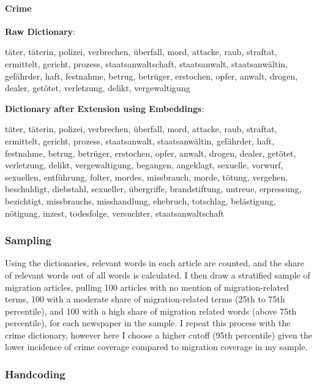 \documentclass[
]{article}
\begin{document}
\hypertarget{crime}{%
\paragraph{Crime}\label{crime}}

\textbf{Raw Dictionary}:

täter, täterin, polizei, verbrechen, überfall, mord, attacke, raub, straftat, ermittelt, gericht, prozess, staatsanwaltschaft, staatsanwalt, staatsanwältin, gefährder, haft, festnahme, betrug, betrüger, erstochen, opfer, anwalt, drogen, dealer, getötet, verletzung, delikt, vergewaltigung

\textbf{Dictionary after Extension using Embeddings}:

täter, täterin, polizei, verbrechen, überfall, mord, attacke, raub, straftat, ermittelt, gericht, prozess, staatsanwalt, staatsanwältin, gefährder, haft, festnahme, betrug, betrüger, erstochen, opfer, anwalt, drogen, dealer, getötet, verletzung, delikt, vergewaltigung, begangen, angeklagt, sexuelle, vorwurf, sexuellen, entführung, folter, mordes, missbrauch, morde, tötung, vergehen, beschuldigt, diebstahl, sexueller, übergriffe, brandstiftung, untreue, erpressung, bezichtigt, missbrauchs, misshandlung, ehebruch, totschlag, belästigung, nötigung, inzest, todesfolge, versuchter, staatsanwaltschaft

\hypertarget{sampling}{%
\subsubsection{Sampling}\label{sampling}}

Using the dictionaries, relevant words in each article are counted, and the share of relevant words out of all words is calculated. I then draw a stratified sample of migration articles, pulling 100 articles with no mention of migration-related terms, 100 with a moderate share of migration-related terms (25th to 75th percentile), and 100 with a high share of migration related words (above 75th percentile), for each newspaper in the sample. I repeat this process with the crime dictionary, however here I choose a higher cutoff (95th percentile) given the lower incidence of crime coverage compared to migration coverage in my sample.

\pagebreak

\hypertarget{handcoding}{%
\subsubsection{Handcoding}\label{handcoding}}
\end{document}

